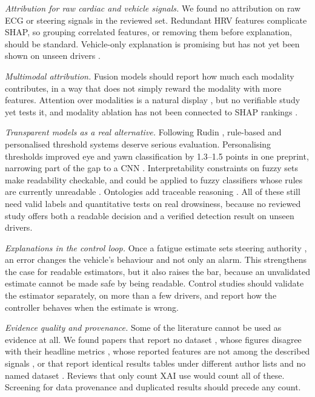 \textit{Attribution for raw cardiac and vehicle signals.} We found no attribution on raw ECG or steering signals in the reviewed set. Redundant HRV features complicate SHAP, so grouping correlated features, or removing them before explanation, should be standard. Vehicle-only explanation is promising but has not yet been shown on unseen drivers \cite{zhu2025madfm}.

\textit{Multimodal attribution.} Fusion models should report how much each modality contributes, in a way that does not simply reward the modality with more features. Attention over modalities is a natural display \cite{theivadas2025dynamic}, but no verifiable study yet tests it, and modality ablation has not been connected to SHAP rankings \cite{guan2025fatigue}.

\textit{Transparent models as a real alternative.} Following Rudin \cite{rudin2019stop}, rule-based and personalised threshold systems deserve serious evaluation. Personalising thresholds improved eye and yawn classification by 1.3--1.5 points in one preprint, narrowing part of the gap to a CNN \cite{ersoy2026improving}. Interpretability constraints on fuzzy sets \cite{yan2026toward} make readability checkable, and could be applied to fuzzy classifiers whose rules are currently unreadable \cite{gao2025comprehensive}. Ontologies add traceable reasoning \cite{georgiadis2026timeaware}. All of these still need valid labels and quantitative tests on real drowsiness, because no reviewed study offers both a readable decision and a verified detection result on unseen drivers.

\textit{Explanations in the control loop.} Once a fatigue estimate sets steering authority \cite{hu2026human,yan2026toward}, an error changes the vehicle's behaviour and not only an alarm. This strengthens the case for readable estimators, but it also raises the bar, because an unvalidated estimate cannot be made safe by being readable. Control studies should validate the estimator separately, on more than a few drivers, and report how the controller behaves when the estimate is wrong.

\textit{Evidence quality and provenance.} Some of the literature cannot be used as evidence at all. We found papers that report no dataset \cite{jha2025realtime}, whose figures disagree with their headline metrics \cite{oise2026enhancing}, whose reported features are not among the described signals \cite{theivadas2025dynamic}, or that report identical results tables under different author lists and no named dataset \cite{sasikala2026robust,nayomi2026vision}. Reviews that only count XAI use would count all of these. Screening for data provenance and duplicated results should precede any count.


